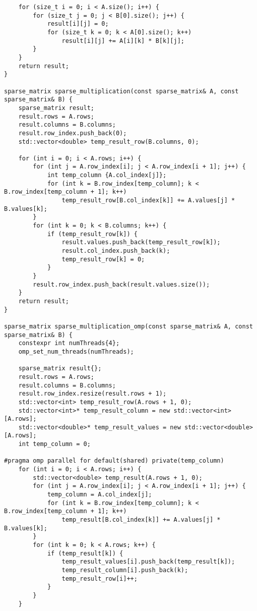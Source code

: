 \documentclass{report}
\begin{document}
\begin{lstlisting}
    for (size_t i = 0; i < A.size(); i++) {
        for (size_t j = 0; j < B[0].size(); j++) {
            result[i][j] = 0;
            for (size_t k = 0; k < A[0].size(); k++)
                result[i][j] += A[i][k] * B[k][j];
        }
    }
    return result;
}

sparse_matrix sparse_multiplication(const sparse_matrix& A, const sparse_matrix& B) {
    sparse_matrix result;
    result.rows = A.rows;
    result.columns = B.columns;
    result.row_index.push_back(0);
    std::vector<double> temp_result_row(B.columns, 0);

    for (int i = 0; i < A.rows; i++) {
        for (int j = A.row_index[i]; j < A.row_index[i + 1]; j++) {
            int temp_column {A.col_index[j]};
            for (int k = B.row_index[temp_column]; k < B.row_index[temp_column + 1]; k++)
                temp_result_row[B.col_index[k]] += A.values[j] * B.values[k];
        }
        for (int k = 0; k < B.columns; k++) {
            if (temp_result_row[k]) {
                result.values.push_back(temp_result_row[k]);
                result.col_index.push_back(k);
                temp_result_row[k] = 0;
            }
        }
        result.row_index.push_back(result.values.size());
    }
    return result;
}

sparse_matrix sparse_multiplication_omp(const sparse_matrix& A, const sparse_matrix& B) {
    constexpr int numThreads{4};
    omp_set_num_threads(numThreads);

    sparse_matrix result{};
    result.rows = A.rows;
    result.columns = B.columns;
    result.row_index.resize(result.rows + 1);
    std::vector<int> temp_result_row(A.rows + 1, 0);
    std::vector<int>* temp_result_column = new std::vector<int>[A.rows];
    std::vector<double>* temp_result_values = new std::vector<double>[A.rows];
    int temp_column = 0;

#pragma omp parallel for default(shared) private(temp_column)
    for (int i = 0; i < A.rows; i++) {
        std::vector<double> temp_result(A.rows + 1, 0);
        for (int j = A.row_index[i]; j < A.row_index[i + 1]; j++) {
            temp_column = A.col_index[j];
            for (int k = B.row_index[temp_column]; k < B.row_index[temp_column + 1]; k++)
                temp_result[B.col_index[k]] += A.values[j] * B.values[k];
        }
        for (int k = 0; k < A.rows; k++) {
            if (temp_result[k]) {
                temp_result_values[i].push_back(temp_result[k]);
                temp_result_column[i].push_back(k);
                temp_result_row[i]++;
            }
        }
    }


\end{lstlisting}
\end{document}
